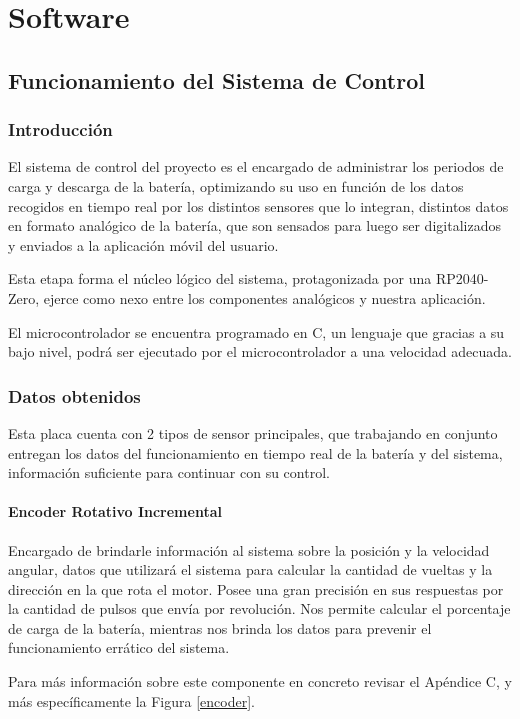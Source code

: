 \chapter{Software}

    \section{Funcionamiento del Sistema de Control}
    
        \subsection{Introducción}
        
            El sistema de control del proyecto es el encargado de administrar los periodos de carga y descarga de la batería, optimizando su uso en función de los datos recogidos en tiempo real por los distintos sensores que lo integran, distintos datos en formato analógico de la batería, que son sensados para luego ser digitalizados y enviados a la aplicación móvil del usuario.\par
            Esta etapa forma el núcleo lógico del sistema, protagonizada por una RP2040-Zero, ejerce como nexo entre los componentes analógicos y nuestra aplicación.\par
            El microcontrolador se encuentra programado en C, un lenguaje que gracias a su bajo nivel, podrá ser ejecutado por el microcontrolador a una velocidad adecuada.\par
            
        \subsection{Datos obtenidos}
        
            Esta placa cuenta con 2 tipos de sensor principales, que trabajando en conjunto entregan los datos del funcionamiento en tiempo real de la batería y del sistema, información suficiente para continuar con su control.\par
            
            \subsubsection{Encoder Rotativo Incremental}
            
                Encargado de brindarle información al sistema sobre la posición y la velocidad angular, datos que utilizará el sistema para calcular la cantidad de vueltas y la dirección en la que rota el motor. Posee una gran precisión en sus respuestas por la cantidad de pulsos que envía por revolución. Nos permite calcular el porcentaje de carga de la batería, mientras nos brinda los datos para prevenir el funcionamiento errático del sistema.\par
                Para más información sobre este componente en concreto revisar el Apéndice C, y más específicamente la Figura \ref{encoder}.\par

